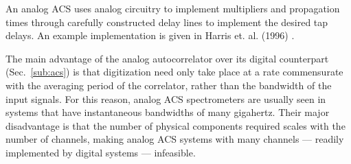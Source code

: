 \documentclass{ws-rv961x669}
\begin{document}





An analog ACS uses analog circuitry to implement multipliers and propagation times through carefully constructed delay lines to implement the desired tap delays. 
An example implementation is given in Harris et. al. (1996) \cite{Harris1998}.

The main advantage of the analog autocorrelator over its digital counterpart (Sec.~\ref{sub:acs}) is that digitization need only take place at a rate commensurate with the averaging period of the correlator, rather than the bandwidth of the input signals. For this reason, analog ACS spectrometers are usually seen in systems that have instantaneous bandwidths of many gigahertz. Their major disadvantage is that the number of physical components required scales with the number of channels, making analog ACS systems with many channels --- readily implemented by digital systems ---  infeasible.


\end{document}
